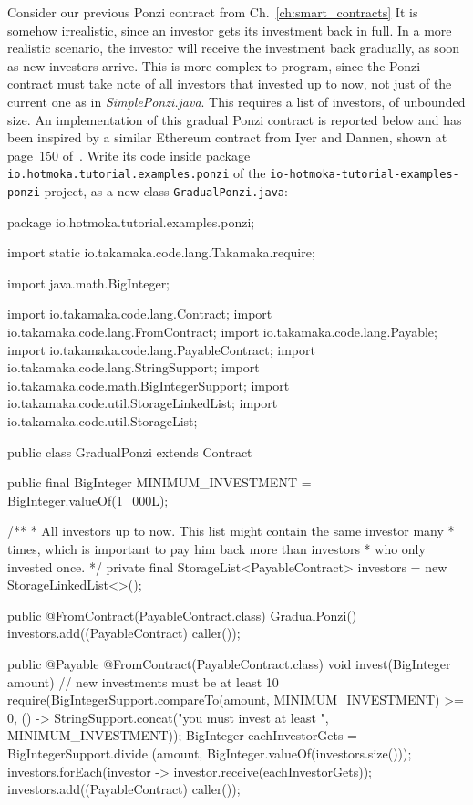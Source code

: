 Consider our previous Ponzi contract from Ch.~\ref{ch:smart_contracts}
It is somehow irrealistic, since
an investor gets its investment back in full. In a more realistic scenario,
the investor will receive the investment back gradually, as soon as new
investors arrive. This is more complex to program, since
the Ponzi contract must take note of all investors that invested up to now,
not just of the current one as in \emph{SimplePonzi.java}. This requires a
list of investors, of unbounded size. An implementation of this gradual
Ponzi contract is reported below and has been
inspired by a similar Ethereum contract from Iyer and Dannen,
shown at page~150 of~\cite{IyerD18}.
Write its code inside package \texttt{io.hotmoka.tutorial.examples.ponzi} of
the \texttt{io-hotmoka-tutorial-examples-ponzi} project, as a new class
\texttt{GradualPonzi.java}:
%
\begin{codebox}\begin{javalst}
package io.hotmoka.tutorial.examples.ponzi;

import static io.takamaka.code.lang.Takamaka.require;

import java.math.BigInteger;

import io.takamaka.code.lang.Contract;
import io.takamaka.code.lang.FromContract;
import io.takamaka.code.lang.Payable;
import io.takamaka.code.lang.PayableContract;
import io.takamaka.code.lang.StringSupport;
import io.takamaka.code.math.BigIntegerSupport;
import io.takamaka.code.util.StorageLinkedList;
import io.takamaka.code.util.StorageList;

public class GradualPonzi extends Contract {
  public final BigInteger MINIMUM_INVESTMENT = BigInteger.valueOf(1_000L);

  /**
   * All investors up to now. This list might contain the same investor many
   * times, which is important to pay him back more than investors
   * who only invested once.
   */
  private final StorageList<PayableContract> investors = new StorageLinkedList<>();

  public @FromContract(PayableContract.class) GradualPonzi() {
    investors.add((PayableContract) caller());
  }

  public @Payable @FromContract(PayableContract.class) void invest(BigInteger amount) {
    // new investments must be at least 10%
    require(BigIntegerSupport.compareTo(amount, MINIMUM_INVESTMENT) >= 0,
      () -> StringSupport.concat("you must invest at least ", MINIMUM_INVESTMENT));
    BigInteger eachInvestorGets = BigIntegerSupport.divide
      (amount, BigInteger.valueOf(investors.size()));
    investors.forEach(investor -> investor.receive(eachInvestorGets));
    investors.add((PayableContract) caller());
  }
}
\end{javalst}\end{codebox}

